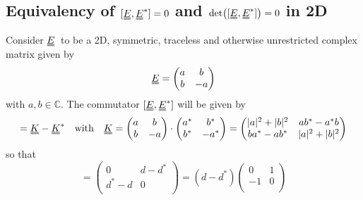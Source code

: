 \documentclass[12pt]{article}
\newcommand{\duf}[2]{\stackunder[0.5pt]{\stackunder[0.8pt]{\stackunder[1pt]{\ensuremath{#1}}{\rule{\widthof{\ensuremath{#2}}*\real{0.9}}{.1ex}}}{\rule{\widthof{\ensuremath{#2}}*\real{0.9}}{.1ex}}}{}}
\newcommand{\du}[1]{\duf{#1}{#1}}
\newcommand{\EE}{\ensuremath{\du{E}}}
\begin{document}
\newpage
\begin{appendices}
    \section{Equivalency of $[\EE,\EE^*]=0$ and $\det([\EE,\EE^*])=0$ in 2D}\label{app:noruaeq}
        Consider \EE\ to be a 2D, symmetric, traceless and otherwise unrestricted complex matrix given by
        \begin{equation}
            \EE = \begin{pmatrix}
                a & b \\
                b & -a \\
            \end{pmatrix}
        \end{equation}
        with $a, b \in \mathbb{C}$.
        The commutator $[\EE,\EE^*]$ will be given by
        \begin{equation}
            [\EE,\EE^*] = \du{K} - \du{K}^* \qq{with} \du{K} = \begin{pmatrix}
                a & b \\
                b & -a \\
            \end{pmatrix} \cdot \begin{pmatrix}
                a^* & b^* \\
                b^* & -a^* \\
            \end{pmatrix} = \begin{pmatrix}
                |a|^2 + |b|^2 & ab^* - a^*b \\
                ba^* - ab^* & |a|^2 + |b|^2 \\
            \end{pmatrix}
        \end{equation}
        so that
        \begin{equation}
            [\EE,\EE^*] = \begin{pmatrix}
                0 & d - d^* \\
                d^* - d & 0 \\
            \end{pmatrix} = (d-d^*) \begin{pmatrix}
                0 & 1 \\
                -1 & 0 \\
            \end{pmatrix}
        \end{equation}

\end{appendices}
\end{document}
